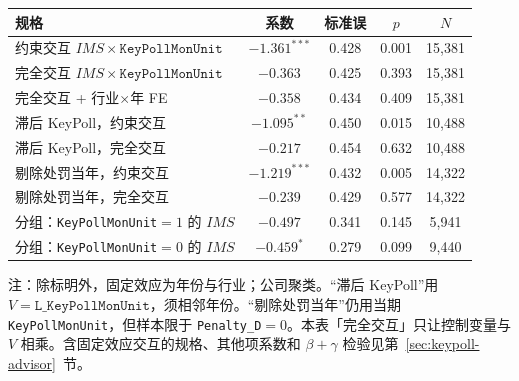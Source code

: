 \documentclass[11pt]{article}
\begin{document}
\begin{center}
\begin{threeparttable}
\caption{重点排污单位：\(IMS\) 交互与分组}
\label{tab:keypoll}
\begin{tabular}{lcccc}
\toprule
规格 & 系数 & 标准误 & \(p\) & \(N\) \\
\midrule
约束交互 \(IMS\times\texttt{KeyPollMonUnit}\) & \(-1.361^{***}\) & 0.428 & 0.001 & 15,381 \\
完全交互 \(IMS\times\texttt{KeyPollMonUnit}\) & \(-0.363\) & 0.425 & 0.393 & 15,381 \\
完全交互 + 行业\(\times\)年 FE & \(-0.358\) & 0.434 & 0.409 & 15,381 \\
滞后 KeyPoll，约束交互 & \(-1.095^{**}\) & 0.450 & 0.015 & 10,488 \\
滞后 KeyPoll，完全交互 & \(-0.217\) & 0.454 & 0.632 & 10,488 \\
剔除处罚当年，约束交互 & \(-1.219^{***}\) & 0.432 & 0.005 & 14,322 \\
剔除处罚当年，完全交互 & \(-0.239\) & 0.429 & 0.577 & 14,322 \\
\midrule
分组：\texttt{KeyPollMonUnit}\(=1\) 的 \(IMS\) & \(-0.497\) & 0.341 & 0.145 & 5,941 \\
分组：\texttt{KeyPollMonUnit}\(=0\) 的 \(IMS\) & \(-0.459^{*}\) & 0.279 & 0.099 & 9,440 \\
\bottomrule
\end{tabular}
\begin{tablenotes}\footnotesize
\item 注：除标明外，固定效应为年份与行业；公司聚类。``滞后 KeyPoll''用 \(V=\texttt{L\_KeyPollMonUnit}\)，须相邻年份。``剔除处罚当年''仍用当期 \texttt{KeyPollMonUnit}，但样本限于 \texttt{Penalty\_D}\(=0\)。本表「完全交互」只让控制变量与 \(V\) 相乘。含固定效应交互的规格、其他项系数和 \(\beta+\gamma\) 检验见第~\ref{sec:keypoll-advisor}~节。
\end{tablenotes}
\end{threeparttable}
\end{center}
\end{document}
